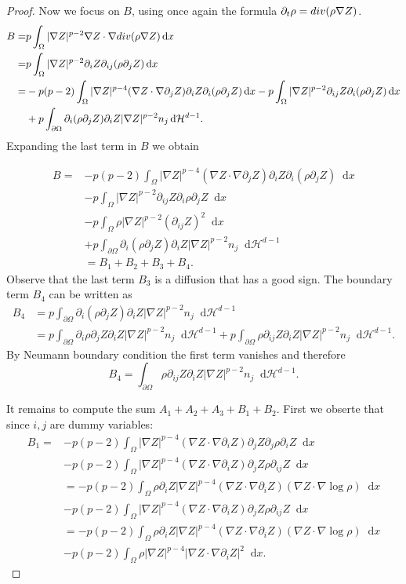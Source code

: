 \documentclass[a4paper,twosided, 11pt]{article}
\newcommand {\Div}  { {\rm div} }
\newcommand {\p}   {\partial}
\theoremstyle{plain}
\theoremstyle{remark}
\newcommand{\diff}{\mathop{}\!\mathrm{d}}
\numberwithin{equation}{section}
\begin{document}
\begin{proof}
Now we focus on $B$, using once again the formula $\p_t \rho = \Div(\rho\nabla Z)$. 
\begin{align*}
B = &p \int_{\Omega} |\nabla Z|^{p-2}\nabla Z\cdot \nabla \Div(\rho\nabla Z)\diff x\\
= &p \int_{\Omega} |\nabla Z|^{p-2}\p_i Z\p_{ij}(\rho\p_{j}Z)\diff x\\
=& -p(p-2)\int_{\Omega} |\nabla Z|^{p-4}(\nabla Z\cdot\nabla\p_{j}Z)\p_i Z \p_{i}(\rho \p_j Z)\diff x -p\int_{\Omega} |\nabla Z|^{p-2}\p_{ij} Z \p_{i}(\rho\p_j Z)\diff x\\
&+ p\int_{\p\Omega}\p_{i}(\rho \p_{j}Z) \p_{i}Z |\nabla Z|^{p-2} n_{j}\diff \mathcal{H}^{d-1}.
\end{align*}
Expanding the last term in $B$ we obtain 

\begin{align*}
B = & -p(p-2)\int_{\Omega} |\nabla Z|^{p-4}(\nabla Z\cdot\nabla\p_{j}Z)\p_i Z \p_{i}(\rho \p_j Z)\diff x\\
&  -p\int_{\Omega} |\nabla Z|^{p-2}\p_{ij} Z \p_{i}\rho\p_j Z\diff x\\
& -p\int_{\Omega} \rho|\nabla Z|^{p-2}(\p_{ij} Z)^2\diff x\\
& + p\int_{\p\Omega}\p_{i}(\rho \p_{j}Z) \p_{i}Z |\nabla Z|^{p-2} n_{j}\diff \mathcal{H}^{d-1}\\
& = B_1 + B_2 + B_3 + B_4.
\end{align*}
Observe that the last term $B_3$ is a diffusion that has a good sign. The boundary term $B_4$ can be written as
\begin{align*}
B_4 &= p\int_{\p\Omega}\p_{i}(\rho \p_{j}Z) \p_{i}Z |\nabla Z|^{p-2} n_{j}\diff \mathcal{H}^{d-1}\\
& = p\int_{\p\Omega}\p_{i}\rho \p_{j}Z \p_{i}Z |\nabla Z|^{p-2} n_{j} \diff \mathcal{H}^{d-1}+ p\int_{\p\Omega}\rho \p_{ij}Z \p_{i}Z |\nabla Z|^{p-2} n_{j}\diff \mathcal{H}^{d-1}.
\end{align*}
By Neumann boundary condition the first term vanishes and therefore 
$$
B_4 = \int_{\p\Omega}\rho \p_{ij}Z \p_{i}Z |\nabla Z|^{p-2} n_{j}\diff \mathcal{H}^{d-1}.
$$

It remains to compute the sum $A_1+ A_2 + A_3 + B_1 + B_2$.
First we obserte that since $i,j$ are dummy variables:
\begin{align*}
B_1 = &-p(p-2)\int_{\Omega} |\nabla Z|^{p-4}(\nabla Z\cdot\nabla\p_{i}Z)\p_j Z \p_{j}\rho\p_i Z\diff x \\
&-p(p-2)\int_{\Omega} |\nabla Z|^{p-4}(\nabla Z\cdot\nabla\p_{i}Z)\p_j Z \rho\p_{ij} Z\diff x\\
&= -p(p-2)\int_{\Omega} \rho\p_i Z|\nabla Z|^{p-4}(\nabla Z\cdot\nabla\p_{i}Z)(\nabla Z\cdot \nabla \log\rho)\diff x\\
&-p(p-2)\int_{\Omega} |\nabla Z|^{p-4}(\nabla Z\cdot\nabla\p_{i}Z)\p_j Z \rho\p_{ij} Z\diff x\\
&= -p(p-2)\int_{\Omega} \rho\p_i Z|\nabla Z|^{p-4}(\nabla Z\cdot\nabla\p_{i}Z)(\nabla Z\cdot \nabla \log\rho)\diff x \\
&-p(p-2)\int_{\Omega} \rho|\nabla Z|^{p-4}|\nabla Z\cdot\nabla\p_{i}Z|^2\diff x.
\end{align*}


\end{proof}
\end{document}
